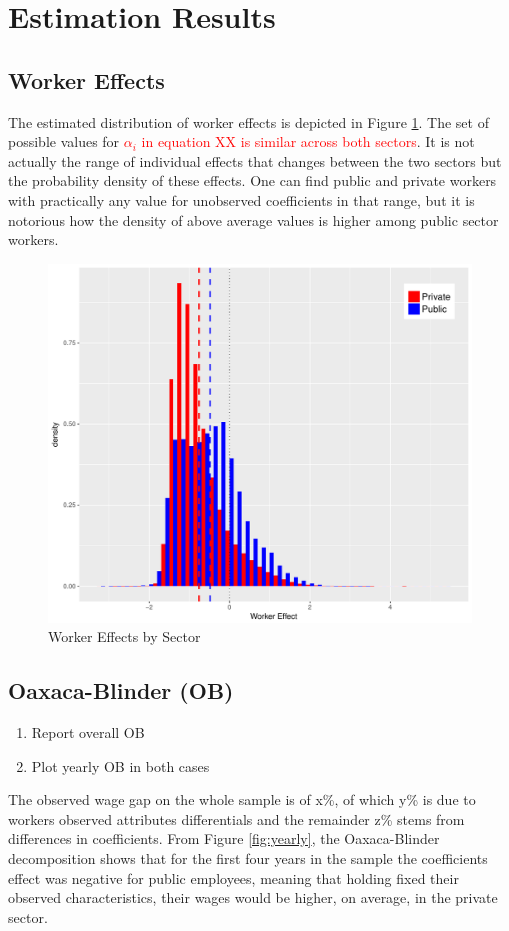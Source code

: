 \documentclass{article}
\begin{document}
\section{Estimation Results}
\subsection{Worker Effects}
The estimated distribution of worker effects is depicted in Figure \ref{fig:we}. The set of possible values for \textcolor{red}{$\alpha_i$ in equation XX is similar across both sectors}. It is not actually the range of individual effects that changes between the two sectors but the probability density of these effects. One can find public and private workers with practically any value for unobserved coefficients in that range, but it is notorious how the density of above average values is higher among public sector workers.\\

\begin{figure}[h!]\label{fig:we}
  \caption{Worker Effects by Sector}
  \includegraphics[scale=0.7]{graphs/001_fe_sector_onepc.pdf}
\end{figure}
\subsection{Oaxaca-Blinder (OB)}
\begin{enumerate}
    \item Report overall OB 
    \item Plot yearly OB in both cases
\end{enumerate}
The observed wage gap on the whole sample is of x\%, of which y\% is due to workers observed attributes differentials and the remainder z\% stems from differences in coefficients. From Figure \ref{fig:yearly}, the Oaxaca-Blinder decomposition shows that for the first four years in the sample the coefficients effect was negative for public employees, meaning that holding fixed their observed characteristics, their wages would be higher, on average, in the private sector. \\
\end{document}
